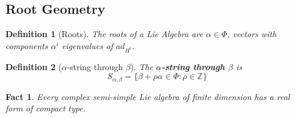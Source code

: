 \documentclass{article}
\newtheorem{definition}{Definition}[subsection]
\newtheorem{fact}{Fact}[subsection]
\newcommand{\bam}[1]{\textbf{#1}}
\newcommand{\mbb}[1]{\mathbb{#1}}
\begin{document}
\subsection{Root Geometry}

\begin{definition}[Roots]
The roots of a Lie Algebra are $\alpha\in\Phi$, vectors with components $\alpha^i$ eigenvalues of $ad_{H^i}$.
\end{definition}

\begin{definition}[$\alpha$-string through $\beta$]
The \bam{$\alpha$-string through $\beta$} is 
\[
S_{\alpha, \beta}=\lbrace \beta+\rho\alpha\in\Phi : \rho\in\mbb{Z} \rbrace
\]
\end{definition}

\begin{fact}
Every complex semi-simple Lie algebra of finite dimension has a real form of compact type.
\end{fact}
\end{document}
